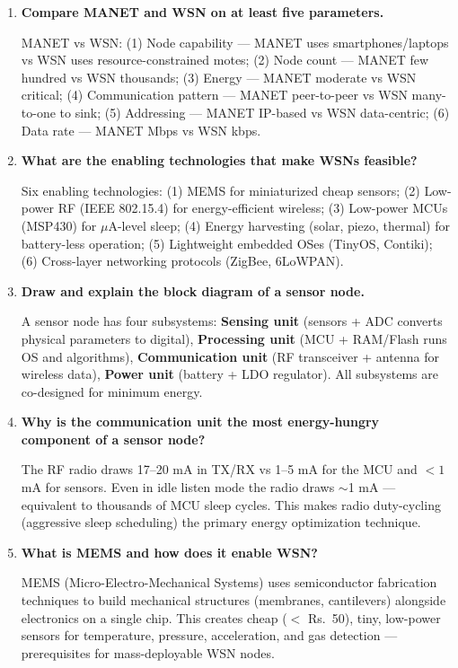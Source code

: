 \documentclass[12pt,a4paper]{article}
\newcommand{\Q}[1]{\textbf{#1}\par\noindent\ignorespaces}
\begin{document}
\begin{tcolorbox}[exambox, title={\textbf{Frequently Asked / Viva Questions}}]
\begin{enumerate}[topsep=0pt, label=\textbf{Q\arabic*.}, itemsep=5pt]
  \item \Q{Compare MANET and WSN on at least five parameters.}
  MANET vs WSN: (1) Node capability --- MANET uses smartphones/laptops vs WSN uses resource-constrained motes; (2) Node count --- MANET few hundred vs WSN thousands; (3) Energy --- MANET moderate vs WSN critical; (4) Communication pattern --- MANET peer-to-peer vs WSN many-to-one to sink; (5) Addressing --- MANET IP-based vs WSN data-centric; (6) Data rate --- MANET Mbps vs WSN kbps.

  \item \Q{What are the enabling technologies that make WSNs feasible?}
  Six enabling technologies: (1) MEMS for miniaturized cheap sensors; (2) Low-power RF (IEEE 802.15.4) for energy-efficient wireless; (3) Low-power MCUs (MSP430) for $\mu$A-level sleep; (4) Energy harvesting (solar, piezo, thermal) for battery-less operation; (5) Lightweight embedded OSes (TinyOS, Contiki); (6) Cross-layer networking protocols (ZigBee, 6LoWPAN).

  \item \Q{Draw and explain the block diagram of a sensor node.}
  A sensor node has four subsystems: \textbf{Sensing unit} (sensors + ADC converts physical parameters to digital), \textbf{Processing unit} (MCU + RAM/Flash runs OS and algorithms), \textbf{Communication unit} (RF transceiver + antenna for wireless data), \textbf{Power unit} (battery + LDO regulator). All subsystems are co-designed for minimum energy.

  \item \Q{Why is the communication unit the most energy-hungry component of a sensor node?}
  The RF radio draws 17--20 mA in TX/RX vs 1--5 mA for the MCU and $<1$ mA for sensors. Even in idle listen mode the radio draws $\sim$1 mA --- equivalent to thousands of MCU sleep cycles. This makes radio duty-cycling (aggressive sleep scheduling) the primary energy optimization technique.

  \item \Q{What is MEMS and how does it enable WSN?}
  MEMS (Micro-Electro-Mechanical Systems) uses semiconductor fabrication techniques to build mechanical structures (membranes, cantilevers) alongside electronics on a single chip. This creates cheap ($<$ Rs.~50), tiny, low-power sensors for temperature, pressure, acceleration, and gas detection --- prerequisites for mass-deployable WSN nodes.


\end{enumerate}
\end{tcolorbox}
\end{document}
